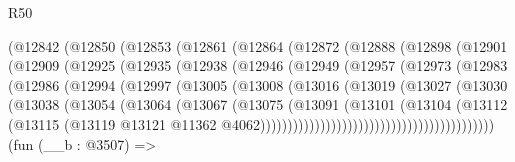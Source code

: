 \begin{lexlean}{R50}
\begin{coremodule}
              (@12842
                (@12850
                  (@12853
                    (@12861
                      (@12864
                        (@12872
                          (@12888
                            (@12898
                              (@12901
                                (@12909
                                  (@12925
                                    (@12935
                                      (@12938
                                        (@12946
                                          (@12949
                                            (@12957
                                              (@12973
                                                (@12983
                                                  (@12986
                                                    (@12994
                                                      (@12997
                                                        (@13005
                                                          (@13008
                                                            (@13016
                                                              (@13019
                                                                (@13027
                                                                  (@13030
                                                                    (@13038
                                                                      (@13054
                                                                        (@13064
                                                                          (@13067
                                                                            (@13075
                                                                              (@13091
                                                                                (@13101
                                                                                  (@13104
                                                                                    (@13112
                                                                                      (@13115
                                                                                        (@13119
                                                                                          @13121
                                                                                          @11362
                                                                                          @4062)))))))))))))))))))))))))))))))))))))))))))
    (fun (__b : @3507) =>

\end{coremodule}
\end{lexlean}
